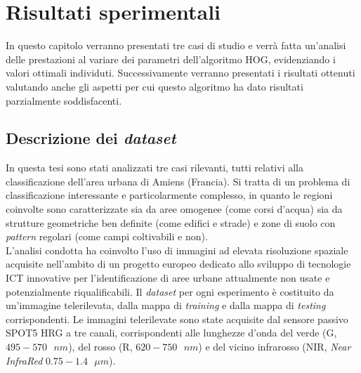 \chapter{Risultati sperimentali} %

\label{cap:risultati} %



In questo capitolo verranno presentati tre casi di studio e verrà fatta un'analisi delle prestazioni al variare dei parametri dell’algoritmo  HOG, evidenziando i valori ottimali individuti. 
Successivamente verranno presentati i risultati ottenuti valutando anche gli aspetti per cui questo algoritmo ha dato risultati parzialmente soddisfacenti.

\clearpage

\section{Descrizione dei \emph{dataset}}
In questa tesi sono stati analizzati tre casi rilevanti, tutti relativi alla classificazione dell'area urbana di Amiens (Francia).  Si tratta di un problema di classificazione interessante e particolarmente complesso, in quanto le regioni coinvolte sono caratterizzate sia da aree omogenee (come corsi d'acqua) sia da strutture geometriche ben definite (come edifici e strade) e zone di suolo con\emph{ pattern} regolari (come campi coltivabili e non).\\
L'analisi condotta ha coinvolto l'uso di immagini ad elevata risoluzione spaziale acquisite nell'ambito di un progetto europeo dedicato allo sviluppo di tecnologie ICT innovative per l'identificazione di aree urbane attualmente non usate e potenzialmente riqualificabili.
Il \emph{dataset} per ogni esperimento è costituito da un'immagine telerilevata, dalla mappa di \emph{training} e dalla mappa di \emph{testing} corrispondenti.
Le immagini telerilevate sono state acquisite dal sensore passivo \textsc{SPOT5 HRG} a tre canali, corrispondenti alle lunghezze d'onda del verde (G, $495 - 570\text{ } nm$), del rosso (R, $620 -  750\text{ } nm$) e del vicino infrarosso (NIR, \emph{Near InfraRed} $0.75 - 1.4\text{ } \mu m$).\\

